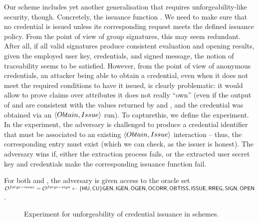 Our \UAS scheme includes yet another generalisation that requires unforgeability-like
security, though. Concretely, the issuance function \fissue. We need to make
sure that no credential is issued unless its corresponding
request meets the defined issuance policy. From the point of view of group
signatures, this may seem redundant. After all, if all valid signatures produce
consistent evaluation and opening results, given the employed user key,
credentials, and signed message, the notion of traceability seems to be
satisfied. However, from the point of view of anonymous credentials, an attacker
being able to obtain a credential, even when it does not meet the required
conditions to have it issued, is clearly problematic: it would allow to prove
claims over attributes it does not really ``own'' (even if the output of \Sign
and \Open are consistent with the values returned by \feval and \finsp, and
the credential was obtained via an $\langle Obtain,Issue \rangle$ run). To
capturethis, we define the \ExpForgeIssue experiment. In the experiment, the
adversary is challenged to produce a credential identifier that must be
associated to an existing $\langle Obtain,Issue \rangle$ interaction -- thus,
the corresponding \trans entry must exist (which we can check, as the issuer is
honest). The adversary wins if, either the extraction process fails, or the
extracted user secret key and credentials make the corresponding issuance
function fail.

For both \ExpForgeIssue and \ExpForgeSign, the adversary is given access to the
oracle set $\mathcal{O}^{forge-issue} = \mathcal{O}^{forge-sign} \gets \lbrace\mathsf{HU},\mathsf{CU}\rbrace\mathsf{GEN},\mathsf{IGEN},
\mathsf{OGEN},\mathsf{OCORR},\mathsf{OBTISS},\mathsf{ISSUE},\mathsf{RREG},\mathsf{SIGN},\mathsf{OPEN}$.

\begin{figure}[htp!]
  \caption{Experiment for unforgeability of credential issuance in \UAS schemes.}
  \label{fig:exp-uas-unfor-issue}
\end{figure}    

